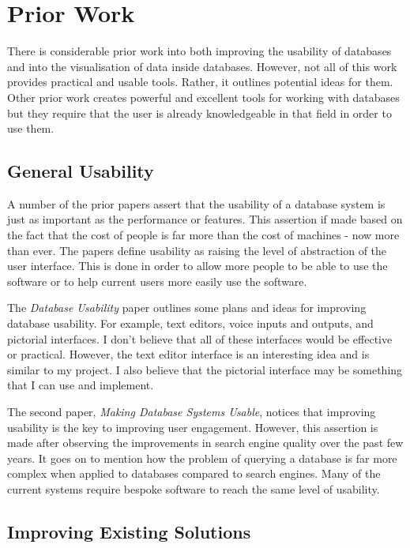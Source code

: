 \chapter{Prior Work}

There is considerable prior work into both improving the usability of databases
and into the visualisation of data inside databases. However, not all of this
work provides practical and usable tools. Rather, it outlines potential ideas
for them. Other prior work creates powerful and excellent tools for working
with databases but they require that the user is already knowledgeable in that
field in order to use them.

\section{General Usability}

A number of the prior papers\cite{Date, Jagadish2007} assert that the usability
of a database system is just as important as the performance or features. This
assertion if made based on the fact that the cost of people is far more than
the cost of machines - now more than ever. The papers define usability as
raising the level of abstraction of the user interface. This is done in order
to allow more people to be able to use the software or to help current users
more easily use the software.

The \emph{Database Usability} paper\cite{Date} outlines some plans and ideas
for improving database usability. For example, text editors, voice inputs and
outputs, and pictorial interfaces. I don't believe that all of these interfaces
would be effective or practical. However, the text editor interface is an
interesting idea and is similar to my project. I also believe that the
pictorial interface may be something that I can use and implement.

The second paper, \emph{Making Database Systems Usable}, notices that improving
usability is the key to improving user engagement. However, this assertion is
made after observing the improvements in search engine quality over the past
few years. It goes on to mention how the problem of querying a database is far
more complex when applied to databases compared to search engines. Many of the
current systems require bespoke software to reach the same level of usability.

\section{Improving Existing Solutions}

